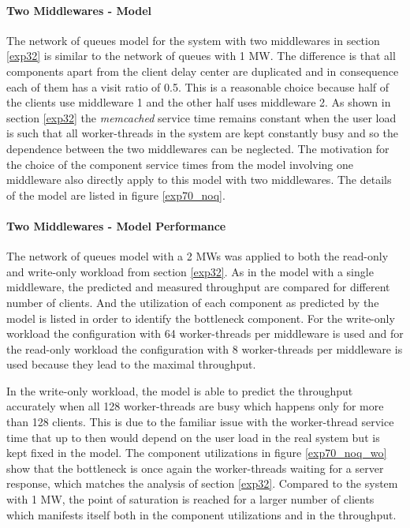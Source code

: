 \documentclass[report.tex]{subfiles}
\begin{document}
\paragraph{Two Middlewares - Model}

The network of queues model for the system with two middlewares in section \ref{exp32} is similar to the network of queues with 1 MW.
The difference is that all components apart from the client delay center are duplicated and in consequence each of them has a visit ratio of 0.5.
This is a reasonable choice because half of the clients use middleware 1 and the other half uses middleware 2. As shown in section \ref{exp32} the \emph{memcached} service time remains constant when the user load is such that all worker-threads in the system are kept constantly busy and so the dependence between the two middlewares can be neglected. The motivation for the choice of the component service times from the model involving one middleware also directly apply to this model with two middlewares.
The details of the model are listed in figure \ref{exp70_noq}.

\paragraph{Two Middlewares - Model Performance}
The network of queues model with a 2 MWs was applied to both the read-only and write-only workload from section \ref{exp32}.
As in the model with a single middleware, the predicted and measured throughput are compared for different number of clients.
And the utilization of each component as predicted by the model is listed in order to identify the bottleneck component. For the write-only workload the configuration with 64 worker-threads per middleware is used and for the read-only workload the configuration with 8 worker-threads per middleware is used because they lead to the maximal throughput.

In the write-only workload, the model is able to predict the throughput accurately when all 128 worker-threads are busy which happens only for more than 128 clients. This is due to the familiar issue with the worker-thread service time that up to then would depend on the user load in the real system but is kept fixed in the model.
The component utilizations in figure \ref{exp70_noq_wo} show that the bottleneck is once again the worker-threads waiting for a server response, which matches the analysis of section \ref{exp32}.  Compared to the system with 1 MW, the point of saturation is reached for a larger number of clients which manifests itself both in the component utilizations and in the throughput.
\end{document}
